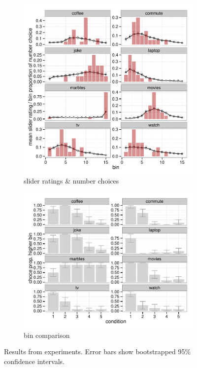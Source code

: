 \documentclass[10pt,letterpaper]{article}
\begin{document}
\begin{figure}
  \centering
  \begin{subfigure}[b]{0.5\textwidth}
    \includegraphics[width = \textwidth]{plots/data_sliderNumber.pdf}
    \caption{slider ratings \& number choices}
    \label{fig:slider}
  \end{subfigure}

  \begin{subfigure}[b]{0.5\textwidth}
    \includegraphics[width = \textwidth]{plots/data_choice.pdf}
    \caption{bin comparison}
    \label{fig:lighting}
  \end{subfigure}

  \caption{Results from experiments. Error bars show bootstrapped 95\% confidence intervals.}
  \label{fig:Results}
\end{figure}
\end{document}
